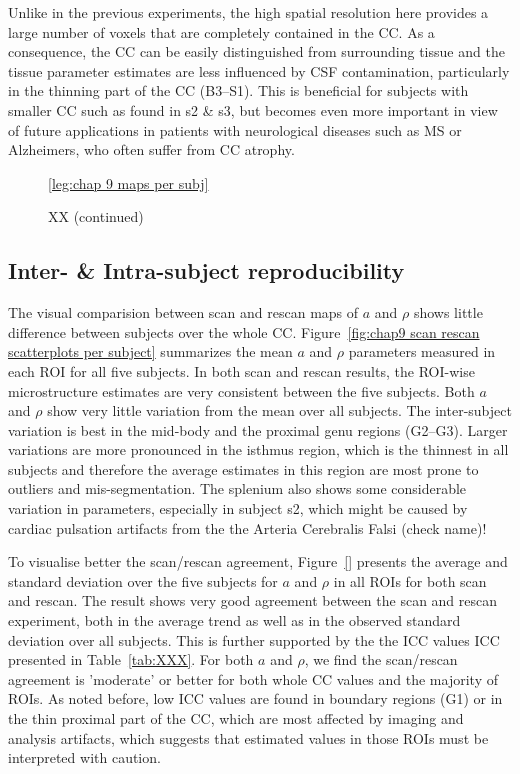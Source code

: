 Unlike in the previous experiments, the high spatial resolution here provides a large number of voxels that are completely contained in the CC. As a consequence, the CC can be easily distinguished from surrounding tissue and the tissue parameter estimates are less influenced by CSF contamination, particularly in the thinning part of the CC (B3--S1). This is beneficial for subjects with smaller CC such as found in s2 \& s3, but becomes even more important in view of future applications in patients with neurological diseases such as MS or Alzheimers, who often suffer from CC atrophy. 
\begin{figure}[ht]
	\centering
 	\ref{leg:chap 9 maps per subj}
	\caption{XX (continued)}
	\label{fig:chap9 scan rescan maps per subject}
\end{figure}

\subsection*{Inter- \& Intra-subject reproducibility}
The visual comparision between scan and rescan maps of $a$ and $\rho$ shows little difference between subjects over the whole CC. Figure~\ref{fig:chap9 scan rescan scatterplots per subject} summarizes the mean $a$ and $\rho$ parameters measured in each ROI for all five subjects. In both scan and rescan results, the ROI-wise microstructure estimates are very consistent between the five subjects. Both $a$ and $\rho$ show very little variation from the mean over all subjects. The inter-subject variation is best in the mid-body and the proximal genu regions (G2--G3). Larger variations are more pronounced in the isthmus region, which is the thinnest in all subjects and therefore the average estimates in this region are most prone to outliers and mis-segmentation. The splenium also shows some considerable variation in parameters, especially in subject s2, which might be caused by cardiac pulsation artifacts from the the Arteria Cerebralis Falsi (check name)! 



To visualise better the scan/rescan agreement, Figure~\ref{} presents the average and standard deviation over the five subjects for $a$ and $\rho$ in all ROIs for both scan and rescan. The result shows very good agreement between the scan and rescan experiment, both in the average trend as well as in the observed standard deviation over all subjects. This is further supported by the the ICC values \gls{ICC} presented in Table~\ref{tab:XXX}. For both $a$ and $\rho$, we find the scan/rescan agreement is 'moderate' or better for both whole CC values and the majority of ROIs. As noted before, low ICC values are found in boundary regions (G1) or in the thin proximal part of the CC, which are most affected by imaging and analysis artifacts, which suggests that estimated values in those ROIs must be interpreted with caution.

